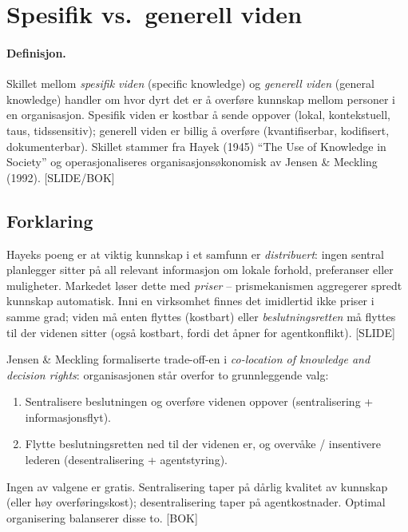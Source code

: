 \section{Spesifik vs.\ generell viden}\label{thr:specific-vs-general-knowledge}

\paragraph{Definisjon.} Skillet mellom \emph{spesifik viden} (specific knowledge) og \emph{generell viden} (general knowledge) handler om hvor dyrt det er å overføre kunnskap mellom personer i en organisasjon. Spesifik viden er kostbar å sende oppover (lokal, kontekstuell, taus, tidssensitiv); generell viden er billig å overføre (kvantifiserbar, kodifisert, dokumenterbar). Skillet stammer fra Hayek (1945) ``The Use of Knowledge in Society'' og operasjonaliseres organisasjonsøkonomisk av Jensen \& Meckling (1992). [SLIDE/BOK]

\subsection*{Forklaring}

Hayeks poeng er at viktig kunnskap i et samfunn er \emph{distribuert}: ingen sentral planlegger sitter på all relevant informasjon om lokale forhold, preferanser eller muligheter. Markedet løser dette med \emph{priser} -- prismekanismen aggregerer spredt kunnskap automatisk. Inni en virksomhet finnes det imidlertid ikke priser i samme grad; viden må enten flyttes (kostbart) eller \emph{beslutningsretten} må flyttes til der videnen sitter (også kostbart, fordi det åpner for agentkonflikt). [SLIDE]

Jensen \& Meckling formaliserte trade-off-en i \emph{co-location of knowledge and decision rights}: organisasjonen står overfor to grunnleggende valg:
\begin{enumerate}
\item Sentralisere beslutningen og overføre videnen oppover (sentralisering + informasjonsflyt).
\item Flytte beslutningsretten ned til der videnen er, og overvåke / insentivere lederen (desentralisering + agentstyring).
\end{enumerate}
Ingen av valgene er gratis. Sentralisering taper på dårlig kvalitet av kunnskap (eller høy overføringskost); desentralisering taper på agentkostnader. Optimal organisering balanserer disse to. [BOK]

